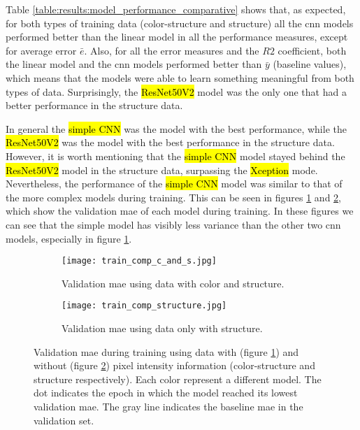 Table \ref{table:results:model_performance_comparative} shows that, as expected, for both types of training data (color-structure and structure) all the \gls{cnn} models performed better than the linear model in all the performance measures, except for average error $\bar{e}$.
Also, for all the error measures and the $R2$ coefficient, both the linear model and the \gls{cnn} models performed better than $\bar{y}$ (baseline values), which means that the models were able to learn something meaningful from both types of data. Surprisingly, the \hl{ResNet50V2} model was the only one that had a better performance in the structure data.

In general the \hl{simple CNN} was the model with the best performance, while the \hl{ResNet50V2} was the model with the best performance in the structure data. However, it is worth mentioning that the \hl{simple CNN} model stayed behind the \hl{ResNet50V2} model in the structure data, surpassing the \hl{Xception} mode. Nevertheless, the performance of the \hl{simple CNN} model was similar to that of the more complex models during training.
This can be seen in figures \ref{fig:results:train_per_com:cs} and \ref{fig:results:train_per_com:s}, which show the validation \gls{mae} of each model during training.
In these figures we can see that the simple model has visibly less variance than the other two \gls{cnn} models, especially in figure \ref{fig:results:train_per_com:cs}.

\begin{figure}[!ht]
  \centering
  \begin{subfigure}[b]{.9\linewidth}
    \texttt{[image: train\_comp\_c\_and\_s.jpg]}
    \caption{Validation \gls{mae} using data with color and structure.}
    \label{fig:results:train_per_com:cs}
  \end{subfigure}%
  \vspace{3mm}
  \begin{subfigure}[b]{.9\linewidth}
    \texttt{[image: train\_comp\_structure.jpg]}
    \caption{Validation \gls{mae} using data only with structure.}
    \label{fig:results:train_per_com:s}
  \end{subfigure}
  \caption{Validation \gls{mae} during training using data with (figure \ref{fig:results:train_per_com:cs}) and without (figure \ref{fig:results:train_per_com:s}) pixel intensity information (color-structure and structure respectively). Each color represent a different model. The dot indicates the epoch in which the model reached its lowest validation \gls{mae}. The gray line indicates the baseline \gls{mae} in the validation set. }
  \label{fig:results:train_per_com}
\end{figure}

